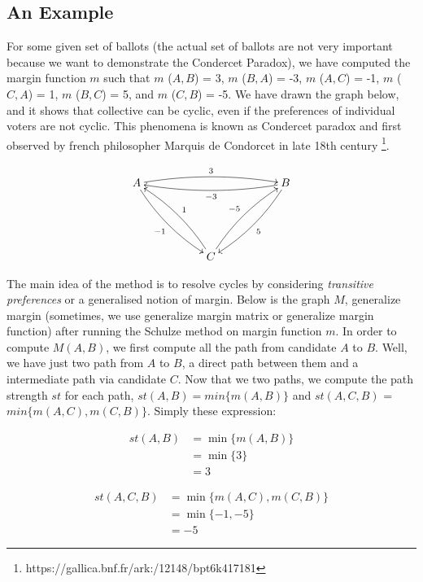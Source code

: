 	\subsection{An Example}
	For some given set of ballots (the actual set of ballots are not very important because we want to demonstrate the Condercet Paradox), we have computed 
	the margin function $m$ such that $m$ ($A, B$) = 3, $m$ ($B, A$) = -3, $m$ ($A, C$) = -1, 
	$m$ ($C, A$) = 1, $m$ ($B, C$) = 5, and $m$ ($C, B$) = -5. We have drawn the graph below, and 
	it shows that collective can be cyclic, even if the preferences of individual voters are not cyclic. This phenomena 
	is known as Condercet paradox and first observed by french philosopher Marquis de Condorcet in late 18th century \footnote{https://gallica.bnf.fr/ark:/12148/bpt6k417181}.
	     
\[
\xymatrix@R=12ex@C=12ex{
A \ar@/^/[rr]^{3} \ar@/_/[dr]_{-1} & & B \ar@/^/[ll]^{-3}
\ar@/^/[dl]^5 \\
& C \ar@/_/[ul]_{1} \ar@/^/[ur]^{-5}
}\]

The main idea of the method is to resolve cycles by considering \emph{transitive preferences} or a generalised notion of margin. Below is the graph $M$, generalize 
margin (sometimes, we use generalize margin matrix or generalize margin function) after running  the Schulze method on margin function $m$.  In order to 
compute $M(A, B)$, we first compute all the path from candidate $A$ to $B$. Well, we have just two path from $A$ to $B$, a direct path between them and 
a intermediate path via candidate $C$.  Now that we two paths, we compute the path strength $st$ for each path, $st(A, B) = min \lbrace m (A, B) \rbrace $ 
and $st (A, C, B)$ = $min \lbrace m (A, C), m (C, B) \rbrace$.  Simply these expression:

\begin{align}
st (A, B)&=  \min \lbrace m (A, B) \rbrace  \nonumber \\
					  &= \min \lbrace 3 \rbrace \nonumber \\
                     &= 3 \nonumber
\end{align}


\begin{align}
st (A, C, B)&=  \min \lbrace m (A, C), m (C, B) \rbrace  \nonumber \\
                     &= \min \lbrace -1, -5 \rbrace \nonumber \\
                     &= -5\nonumber
\end{align}

